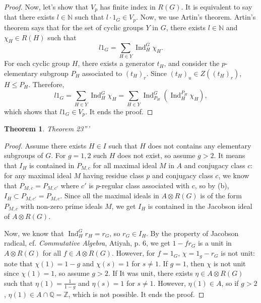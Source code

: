 \documentclass[a4paper, 12pt]{article}
\theoremstyle{Mydefinition}
\theoremstyle{Mytheorem}
\newtheorem{theorem}[statement]{Theorem}
\DeclareMathOperator{\Ind}{Ind}
\begin{document}
\begin{enumerate}
\begin{proof}
    Now, let's show that $V_p$ has finite index in $R(G)$. It is equivalent to say that there exists $l\in\mathbb{N}$ such that $l\cdot 1_G \in V_p$. Now, we use Artin's theorem. Artin's theorem says that for the set of cyclic groups $Y$ in $G$, there exists $l\in\mathbb{N}$ and $\chi_H\in R(H)$ such that
    \begin{equation}
        l1_G = \sum_{H\in Y}\Ind_H^G \chi_H.
    \end{equation}
    For each cyclic group $H$, there exists a generator $t_H$, and consider the $p$-elementary subgroup $P_H$ associated to $(t_H)_r$. Since $(t_H)_u\in Z((t_H)_r)$, $H\leq P_H$. Therefore,
    \begin{equation}
        l1_G = \sum_{H\in Y}\Ind_H^G \chi_H = \sum_{H\in Y}\Ind_{P_H}^G\left(\Ind_H^{P_H}\chi_H\right),
    \end{equation}
    which shows that $l1_G\in V_p$. It ends the proof.
    \end{proof}
    
    \begin{theorem}
    Theorem 23'''
    \end{theorem}
    \begin{proof}
    Assume there exists $H\in I$ such that $H$ does not contains any elementary subgroups of $G$. For $g=1,2$ such $H$ does not exist, so assume $g>2$. It means that $I_H$ is contained in $P_{M,c}$ for all maximal ideal $M$ in $A$ and conjugacy class $c$: for any maximal ideal $M$ having residue class $p$ and conjugacy class $c$, we know that $P_{M,c}=P_{M, c'}$ where $c'$ is $p$-regular class associated with $c$, so by (b), $I_H\subset P_{M,c'} = P_{M,c}$. Since all the maximal ideals in $A\otimes R(G)$ is of the form $P_{M,c}$ with non-zero prime ideals $M$, we get $I_H$ is contained in the Jacobson ideal of $A\otimes R(G)$.
    
    Now, we know that $\Ind_H^G r_H = r_G$, so $r_G\in I_H$. By the property of Jacobson radical, cf. \textit{Commutative Algebra}, Atiyah, p. 6, we get $1-fr_G$ is a unit in $A\otimes R(G)$ for all $f\in A\otimes R(G)$. However, for $f = 1_G$, $\chi = 1_g-r_G$ is not unit: note that $\chi(1)=1-g$ and $\chi(s) = 1$ for $s\neq 1$. If $g=1$, then $\chi$ is not unit since $\chi(1)=1$, so assume $g>2$. If It was unit, there exists $\eta\in A\otimes R(G)$ such that $\eta(1)=\frac{1}{1-g}$ and $\eta(s) = 1$ for $s\neq 1$. However, $\eta(1)\in A$, so if $g>2$, $\eta(1)\in A\cap \mathbb{Q}=\mathbb{Z}$, which is not possible. It ends the proof.
    \end{proof}
\end{enumerate}
\end{document}
